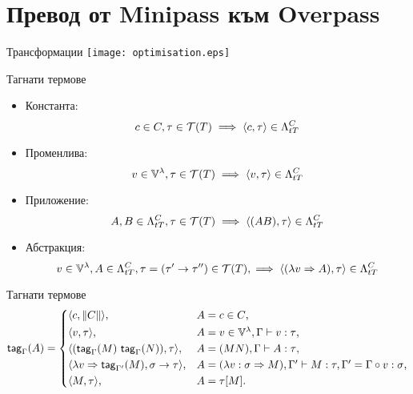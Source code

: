 \documentclass[9pt]{beamer}
\begin{document}
  \section{Превод от Minipass към Overpass}
  \begin{frame}{Трансформации}
    \texttt{[image: optimisation.eps]}
  \end{frame}

  \begin{frame}{Тагнати термове}
    \begin{itemize}
        \item Константа:
            \[ c \in C, \tau \in \tclos{T} \implies \ttt{c}{\tau} \in \ttlambda{T}{C} \]
        \item Променлива:
            \[ v \in \lvars, \tau \in \tclos{T} \implies \ttt{v}{\tau} \in \ttlambda{T}{C} \]
        \item Приложение:
            \[ A, B \in \ttlambda{T}{C}, \tau \in \tclos{T} \implies \ttt{(AB)}{\tau} \in \ttlambda{T}{C} \]
        \item Абстракция:
            \[ v \in \lvars, A \in \ttlambda{T}{C},
                \tau = (\tau' \tot \tau'') \in \tclos{T},
                \implies \ttt{(\lambda v \abstr A)}{\tau} \in \ttlambda{T}{C} \]
    \end{itemize}
  \end{frame}
  \begin{frame}{Тагнати термове}
      \[
      \mcf{tag}_{\Gamma}(A) =
      \begin{cases*}
          \ttt{c}{\typeof{C}} ,& $A = c \in C$, \\
          \ttt{v}{\tau} ,& $A = v \in \lvars, \Gamma \vdash v : \tau$, \\
          \ttt{(\mcf{tag}_{\Gamma}(M) \app \mcf{tag}_{\Gamma}(N))}{\tau}
,& $A = (MN), \Gamma \vdash A : \tau$, \\
          \ttt{\lambda v \abstr \mcf{tag}_{\Gamma'}(M)}{\sigma \tot \tau}
,& $A = (\lambda v: \sigma \abstr M)
                , \Gamma' \vdash M : \tau
                , \Gamma' = \Gamma \circ v : \sigma$,\\
          \ttt{M}{\tau} ,& $A = \tau[M]$. \\
      \end{cases*}
    \]
  \end{frame}
\end{document}
